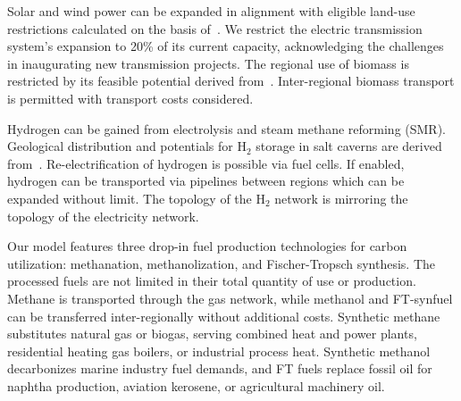 \documentclass[twocolumn]{article}
\newcommand{\hydrogen}{H$_2$}
\begin{document}
Solar and wind power can be expanded in alignment with eligible land-use restrictions calculated on the basis of~\cite{eeaCorineLandCover2012,eeaNatura2000Data2016}. We restrict the electric transmission system's expansion to 20\% of its current capacity, acknowledging the challenges in inaugurating new transmission projects.
The regional use of biomass is restricted by its feasible potential derived from~\cite{enspreso_database,instituteforenergyandtransportjointresearchcentreJRCEUTIMESModelBioenergy2015}. Inter-regional biomass transport is permitted with transport costs considered.

Hydrogen can be gained from electrolysis and steam methane reforming (SMR). Geological distribution and potentials for \hydrogen{} storage in salt caverns are derived from~\cite{caglayanTechnicalPotentialSalt2020}. Re-electrification of hydrogen is possible via fuel cells. If enabled, hydrogen can be transported via pipelines between regions which can be expanded without limit. The topology of the \hydrogen{} network is mirroring the topology of the electricity network.

Our model features three drop-in fuel production technologies for carbon utilization: methanation, methanolization, and Fischer-Tropsch synthesis. The processed fuels are not limited in their total quantity of use or production. Methane is transported through the gas network, while methanol and FT-synfuel can be transferred inter-regionally without additional costs. Synthetic methane substitutes natural gas or biogas, serving combined heat and power plants, residential heating gas boilers, or industrial process heat. Synthetic methanol decarbonizes marine industry fuel demands, and FT fuels replace fossil oil for naphtha production, aviation kerosene, or agricultural machinery oil.
\end{document}
